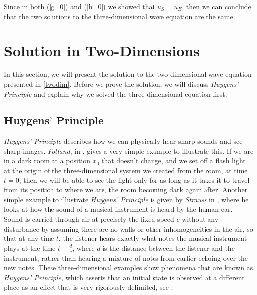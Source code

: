 \documentclass[a4paper, 12pt]{article}
\numberwithin{equation}{section}
\begin{document}
Since in both (\ref{g=0}) and (\ref{h=0}) we showed that $u_S=u_E$, then we can
conclude that the two solutions to the three-dimensional wave equation are the
same.

\section{Solution in Two-Dimensions} \label{sec2d}
In this section, we will present the solution to the two-dimensional wave
equation presented in \ref{twodim}. Before we prove the solution, we will discuss
\emph{Huygens' Principle} and explain why we solved the three-dimensional
equation first.

\subsection{Huygens' Principle}
\emph{Huygens' Principle} describes how we can physically hear sharp sounds and
see sharp images. \emph{Folland}, in \cite[Ch 5.B]{Fol}, gives a very simple example to
illustrate this. If we are in a dark room at a position $x_0$ that doesn't
change, and we set off a flash light at the origin of the three-dimensional
system we created from the room, at time $t=0$, then we will be able to see the
light only for as long as it takes it to travel from its position to where we
are, the room becoming dark again after. Another simple example to illustrate
\emph{Huygens' Principle} is given by \emph{Strauss} in \cite[Ch. 9.2]{Str}, where he
looks at how the sound of a musical instrument is heard by the human ear. Sound
is carried through air at precisely the fixed speed $c$ without any disturbance
by assuming there are no walls or other inhomogeneities in the air, so that at
any time $t$, the listener hears exactly what notes the musical instrument plays
at the time $t-\frac{d}{c}$, where $d$ is the distance between the listener and
the instrument, rather than hearing a mixture of notes from earlier echoing over
the new notes. These three-dimensional examples show phenomena that are known as
\emph{Huygens' Principle}, which asserts that an initial state is observed at a
different place as an effect that is very rigorously delimited, see \cite[Ch.
III, \S 4.6]{Hil} .
\\
\end{document}
